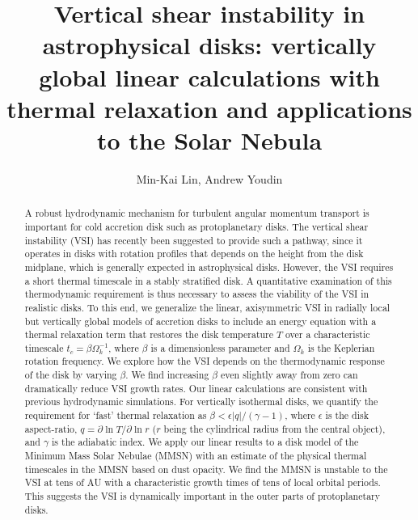 \documentclass[iop]{emulateapj}
\newcommand{\p}{\partial}
\begin{document}
\title{Vertical shear instability in astrophysical disks: vertically global linear calculations with thermal relaxation and applications to the Solar Nebula} 
\author{Min-Kai Lin, Andrew Youdin}

\begin{abstract}
  A robust hydrodynamic mechanism for turbulent angular momentum
  transport is important for cold accretion disk such as 
  protoplanetary disks. The vertical shear instability (VSI) has 
  recently been suggested to provide such a pathway, since it operates in
  disks with rotation profiles that depends on the height from the
  disk  midplane, which is generally expected in  
  astrophysical disks. However, the VSI requires a short thermal
  timescale in a stably stratified disk. %
  A quantitative examination of this thermodynamic 
  requirement is thus necessary to assess the viability of
  the VSI in realistic disks. To this end,  
  we generalize the linear, axisymmetric VSI in radially local but
  vertically global models of accretion disks to include an energy
  equation with a thermal relaxation term that restores the disk
  temperature $T$ over a characteristic timescale
  $t_c=\beta\Omega_k^{-1}$, where $\beta$ is a dimensionless parameter
  and $\Omega_k$ is the Keplerian rotation frequency. We explore how
  the VSI depends on the thermodynamic response  of the disk by
  varying $\beta$. We find increasing $\beta$ even slightly away from
  zero can dramatically reduce VSI growth rates. %
  Our  linear calculations are consistent with previous hydrodynamic
  simulations. For vertically isothermal disks, we quantify the
  requirement for `fast' thermal relaxation as $\beta < \epsilon|q|/(\gamma-1)$, where
  $\epsilon$ is the disk aspect-ratio, $q = \p\ln T/\p\ln r$  ($r$
  being the cylindrical radius from the central object), and 
  $\gamma$ is the adiabatic index. We apply our linear
  results to a disk model of the Minimum Mass Solar Nebulae (MMSN)
  with an estimate of the physical thermal timescales in the MMSN
  based on dust opacity. We find the MMSN is unstable to the VSI at
  tens of AU with a characteristic growth times of tens of local
  orbital periods. This suggests the VSI is dynamically important in
  the outer parts of protoplanetary disks.  
\end{abstract}
\end{document}
